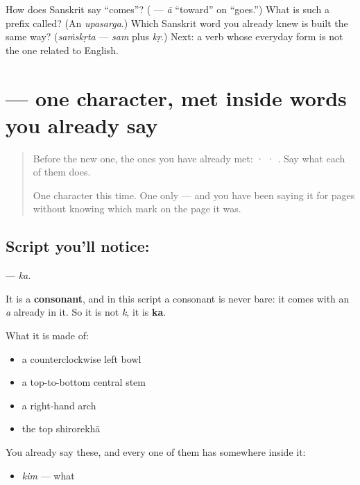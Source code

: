 \begin{tcolorbox}[breakable,colback=teal!4,colframe=teal!35!black,title={Before you move on}]
How does Sanskrit say \textquotedblleft{}comes\textquotedblright{}? (\textbf{} — \emph{ā} \textquotedblleft{}toward\textquotedblright{} on \textquotedblleft{}goes.\textquotedblright{}) What is such a prefix called? (An \emph{upasarga}.) Which Sanskrit word you already knew is built the same way? (\emph{saṁskṛta} — \emph{sam} plus \emph{kṛ}.) Next: a verb whose everyday form is not the one related to English.
\end{tcolorbox}
\section[\texorpdfstring{\sk{क} (ka)}{क (ka)}]{ — one character, met inside words you already say}

\label{lesson:SA-S111-letter-ka}



\begin{quote}
Before the new one, the ones you have already met:  ·  · . Say what each of them does.

One character this time. One only — and you have been saying it for pages without knowing which mark on the page it was.
\end{quote}

\subsection*{Script you'll notice: }
\textbf{} — \emph{ka}.

It is a \textbf{consonant}, and in this script a consonant is never bare: it comes with an \emph{a} already in it. So it is not \emph{k}, it is \textbf{ka}.

What it is made of:

\begin{itemize}
\raggedright
  \item a counterclockwise left bowl
  \item a top-to-bottom central stem
  \item a right-hand arch
  \item the top shirorekhā
\end{itemize}

You already say these, and every one of them has  somewhere inside it:

\begin{itemize}
\raggedright
  \item \textbf{} \emph{kim} — what
\end{itemize}

